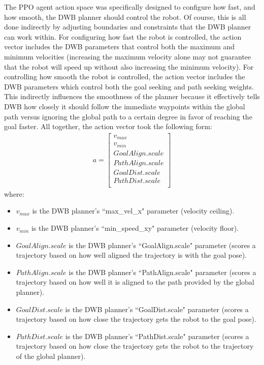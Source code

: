 \documentclass[conference]{IEEEtran}
\begin{document}
        The PPO agent action space was specifically designed to configure how fast, and how smooth, the DWB planner should control the robot. Of course, this is all done indirectly by adjusting boundaries and constraints that the DWB planner can work within. For configuring how fast the robot is controlled, the action vector includes the DWB parameters that control both the maximum and minimum velocities (increasing the maximum velocity alone may not guarantee that the robot will speed up without also increasing the minimum velocity). For controlling how smooth the robot is controlled, the action vector includes the DWB parameters which control both the goal seeking and path seeking weights. This indirectly influences the smoothness of the planner because it effectively tells DWB how closely it should follow the immediate waypoints within the global path versus ignoring the global path to a certain degree in favor of reaching the goal faster. All together, the action vector took the following form:
        \begin{gather*}
            a =
            \begin{bmatrix}
                v_{max} \\
                v_{min} \\
                GoalAlign.scale \\
                PathAlign.scale \\
                GoalDist.scale \\
                PathDist.scale \\
            \end{bmatrix}
        \end{gather*}
        where:
        \begin{itemize}
            \item $v_{max}$ is the DWB planner's ``max\_vel\_x" parameter (velocity ceiling).
            \item $v_{min}$ is the DWB planner's ``min\_speed\_xy" parameter (velocity floor).
            \item $GoalAlign.scale$ is the DWB planner's ``GoalAlign.scale" parameter (scores a trajectory based on how well aligned the trajectory is with the goal pose).
            \item $PathAlign.scale$ is the DWB planner's ``PathAlign.scale" parameter (scores a trajectory based on how well it is aligned to the path provided by the global planner).
            \item $GoalDist.scale$ is the DWB planner's ``GoalDist.scale" parameter (scores a trajectory based on how close the trajectory gets the robot to the goal pose).
            \item $PathDist.scale$ is the DWB planner's ``PathDist.scale" parameter (scores a trajectory based on how close the trajectory gets the robot to the trajectory of the global planner).
        \end{itemize}
        
\end{document}
